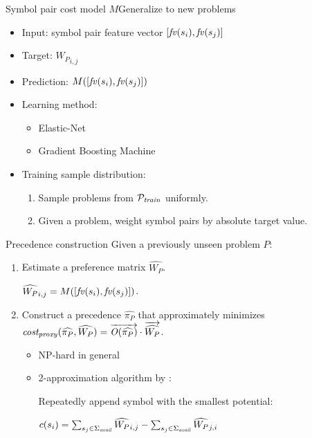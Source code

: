 \documentclass[notes]{beamer}
\begin{document}
\begin{frame}{Symbol pair cost model $M$}{Generalize to new problems}
\begin{itemize}
	\item Input: symbol pair feature vector $[\mathit{fv}(s_i), \mathit{fv}(s_j)]$
	\item Target: ${W_P}_{i,j}$
	\item Prediction: $M([\mathit{fv}(s_i), \mathit{fv}(s_j)])$
	\item Learning method:
	\begin{itemize}
		\item Elastic-Net
		\item Gradient Boosting Machine
	\end{itemize}
	\item Training sample distribution:
	\begin{enumerate}
		\item Sample problems from $\mathcal{P}_{\mathit{train}}$ uniformly.
		\item Given a problem, weight symbol pairs by absolute target value.
	\end{enumerate}
\end{itemize}
\end{frame}

\begin{frame}{Precedence construction}
Given a previously unseen problem $P$:
\begin{enumerate}
	\item Estimate a preference matrix $\widehat{W_P}$.
	
	$\widehat{W_P}_{i,j} = M([\mathit{fv}(s_i), \mathit{fv}(s_j)])$.
	\item Construct a precedence \(\widehat{\pi_P}\) that approximately minimizes
	$\operatorname{\mathit{cost_{proxy}}}(\widehat{\pi_P}, \widehat{W_P}) = \overrightarrow{\operatorname{\mathit{O}}(\widehat{\pi_P})} \cdot \overrightarrow{\widehat{W_P}}$.
	\begin{itemize}
		\item NP-hard in general
		\item 2-approximation algorithm by \citet{Cohen2011}:
		
		Repeatedly append symbol with the smallest potential:
		
		$c(s_i) = \sum_{s_j \in \operatorname{\Sigma}_{\mathit{avail}}} \widehat{W_P}_{i, j} - \sum_{s_j \in \operatorname{\Sigma}_{\mathit{avail}}} \widehat{W_P}_{j, i}$
	\end{itemize}
\end{enumerate}
\end{frame}
\end{document}
